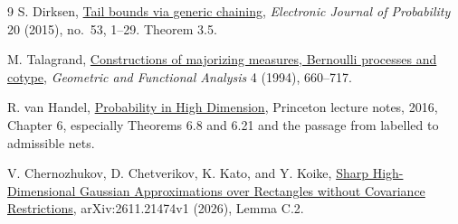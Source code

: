 \documentclass[11pt,letterpaper,twoside,leqno]{article}
\theoremstyle{bookplain}
\begin{document}
\begin{thebibliography}{9}
 S. Dirksen, \href{https://doi.org/10.1214/EJP.v20-3760}{Tail bounds via generic chaining}, \emph{Electronic Journal of Probability} 20 (2015), no.~53, 1--29. Theorem 3.5.

 M. Talagrand, \href{https://doi.org/10.1007/BF01896658}{Constructions of majorizing measures, Bernoulli processes and cotype}, \emph{Geometric and Functional Analysis} 4 (1994), 660--717.

 R. van Handel, \href{https://swh.princeton.edu/~rvan/migrated-to-math-2018-06-20/APC550.pdf}{Probability in High Dimension}, Princeton lecture notes, 2016, Chapter 6, especially Theorems 6.8 and 6.21 and the passage from labelled to admissible nets.

 V. Chernozhukov, D. Chetverikov, K. Kato, and Y. Koike, \href{https://arxiv.org/abs/2611.21474v1}{Sharp High-Dimensional Gaussian Approximations over Rectangles without Covariance Restrictions}, arXiv:2611.21474v1 (2026), Lemma C.2.
\end{thebibliography}
\end{document}
